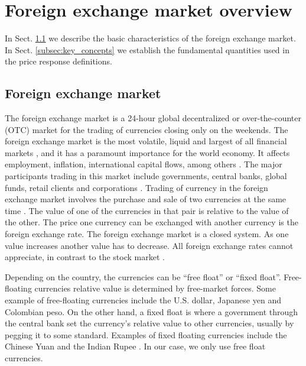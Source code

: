 \section{Foreign exchange market overview}\label{sec:forex_overview}

In Sect. \ref{subsec:forex_market} we describe the basic characteristics of the
foreign exchange market. In Sect. \ref{subsec:key_concepts} we establish the
fundamental quantities used in the price response definitions.

\subsection{Foreign exchange market}\label{subsec:forex_market}

The foreign exchange market is a 24-hour global decentralized or
over-the-counter (OTC) market for the trading of currencies closing only on the
weekends.
The foreign exchange market is the most volatile, liquid and largest of all
financial markets
\cite{forex_liquidity,info_forex,intraday_forex,forex_structure,teach_spread,forex_market_micro,book_forex,book_forex_2,book_forex_3},
and it has a paramount importance for the world economy. It affects employment,
inflation, international capital flows, among others \cite{forex_structure}.
The major participants trading in this market include governments, central
banks, global funds, retail clients and corporations
\cite{book_forex_2,book_forex_3}. Trading of currency in the foreign exchange
market involves the purchase and sale of two currencies at the same time
\cite{book_forex,book_forex_2,book_forex_3}. The value of one of the currencies
in that pair is relative to the value of the other. The price one currency can
be exchanged with another currency is the foreign exchange rate. The foreign
exchange market is a closed system. As one value increases another value has
to decrease. All foreign exchange rates cannot appreciate, in contrast to the
stock market \cite{book_forex,book_forex_3}.

Depending on the country, the currencies can be ``free float'' or
``fixed float''. Free-floating currencies relative value is determined by
free-market forces. Some example of free-floating currencies include the U.S.
dollar, Japanese yen and Colombian peso. On the other hand, a fixed float is
where a government through the central bank set the currency's relative value
to other currencies, usually by pegging it to some standard. Examples of fixed
floating currencies include the Chinese Yuan and the Indian Rupee
\cite{book_forex}. In our case, we only use free float currencies.

